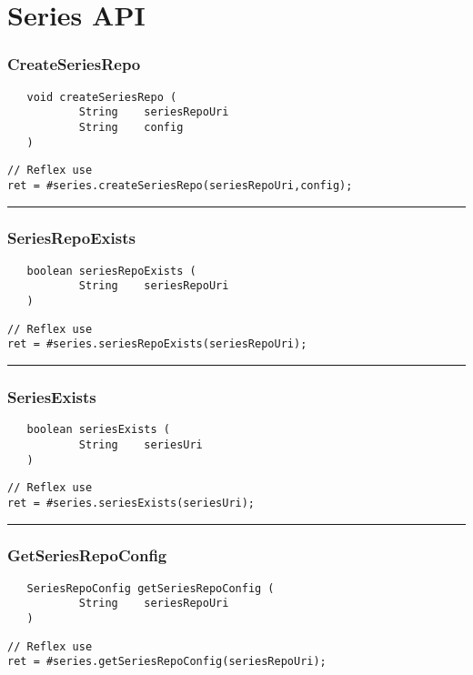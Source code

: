 \section{Series API}

\subsubsection{CreateSeriesRepo}
\label{Api:CreateSeriesRepo}
\begin{verbatim}
   void createSeriesRepo (
           String    seriesRepoUri
           String    config
   )
\end{verbatim}
\begin{lstlisting}[language=reflex]
// Reflex use
ret = #series.createSeriesRepo(seriesRepoUri,config);
\end{lstlisting}



\rule{15cm}{2pt}
\subsubsection{SeriesRepoExists}
\label{Api:SeriesRepoExists}
\begin{verbatim}
   boolean seriesRepoExists (
           String    seriesRepoUri
   )
\end{verbatim}
\begin{lstlisting}[language=reflex]
// Reflex use
ret = #series.seriesRepoExists(seriesRepoUri);
\end{lstlisting}



\rule{15cm}{2pt}
\subsubsection{SeriesExists}
\label{Api:SeriesExists}
\begin{verbatim}
   boolean seriesExists (
           String    seriesUri
   )
\end{verbatim}
\begin{lstlisting}[language=reflex]
// Reflex use
ret = #series.seriesExists(seriesUri);
\end{lstlisting}



\rule{15cm}{2pt}
\subsubsection{GetSeriesRepoConfig}
\label{Api:GetSeriesRepoConfig}
\begin{verbatim}
   SeriesRepoConfig getSeriesRepoConfig (
           String    seriesRepoUri
   )
\end{verbatim}
\begin{lstlisting}[language=reflex]
// Reflex use
ret = #series.getSeriesRepoConfig(seriesRepoUri);
\end{lstlisting}



